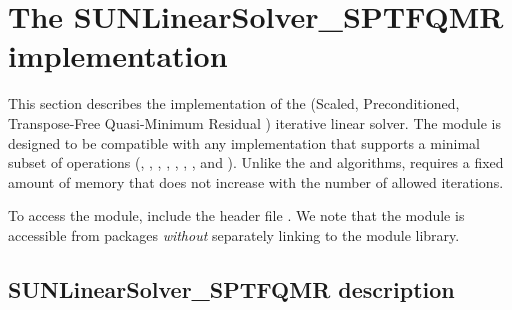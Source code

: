 \section{The SUNLinearSolver\_SPTFQMR implementation}
\label{ss:sunlinsol_sptfqmr}

This section describes the {\sunlinsol} implementation of the {\sptfqmr}
(Scaled, Preconditioned, \newline Transpose-Free Quasi-Minimum Residual \cite{Fre:93})
iterative linear solver. The {\sunlinsolsptfqmr} module is designed to be
compatible with any {\nvector} implementation that supports a minimal subset
of operations (, , ,
, , , , and
). Unlike the {\spgmr} and {\spfgmr} algorithms, {\sptfqmr}
requires a fixed amount of memory that does not increase with the number of
allowed iterations.

To access the {\sunlinsolsptfqmr} module, include the header file \newline
{}. We note that the {\sunlinsolsptfqmr} module is
accessible from {\sundials} packages \textit{without} separately linking to
the  module library.


\subsection{SUNLinearSolver\_SPTFQMR description}
\label{ss:sunlinsol_sptfqmr_description}

